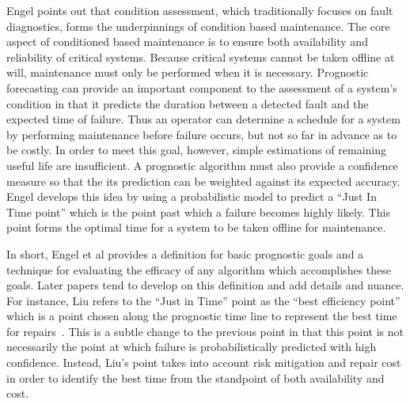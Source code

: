 \documentclass[12pt]{article}
\begin{document}
Engel points out that condition assessment, which traditionally focuses on
fault diagnostics, forms the underpinnings of condition based maintenance.  The
core aspect of conditioned based maintenance is to ensure both availability
and reliability of critical systems.  Because critical systems cannot be taken
offline at will, maintenance must only be performed when it is necessary.
Prognostic forecasting can provide an important component to the assessment of a
system's condition in that it predicts the duration between a detected fault
and the expected time of failure.  Thus an operator can determine a schedule
for a system by performing maintenance before failure occurs, but not so far in
advance as to be costly.  In order to meet this goal, however, simple
estimations of remaining useful life are insufficient.  A prognostic algorithm
must also provide a confidence measure so that the its prediction can be
weighted against its expected accuracy.  Engel develops this idea by using a
probabilistic model to predict a ``Just In Time point'' which is the point
past which a failure becomes highly likely.  This point forms the optimal time
for a system to be taken offline for maintenance.  

In short, Engel et al provides a definition for basic prognostic goals and a
technique for evaluating the efficacy of any algorithm which accomplishes these
goals.  Later papers tend to develop on this definition and add details and
nuance.  For instance, Liu refers to the ``Just in Time'' point as the ``best
efficiency point'' which is a point chosen along the prognostic time line to
represent the best time for repairs~\cite{4585821}.  This is a subtle change to
the previous point in that this point is not necessarily the point at which
failure is probabilistically predicted with high confidence.  Instead, Liu's
point takes into account risk mitigation and repair cost in order to identify
the best time from the standpoint of both availability and cost.
\end{document}
